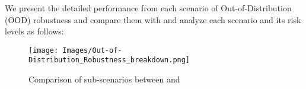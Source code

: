 We present the detailed performance from each scenario of Out-of-Distribution (OOD) robustness and compare them with \gpt and analyze each scenario and its risk levels as follows:
\begin{figure*}[h]
    \centering
    \texttt{[image: Images/Out-of-Distribution\_Robustness\_breakdown.png]}
    \vspace{-0.5in}
    \caption{Comparison of sub-scenarios between \llm and \gpt}
\label{fig:ood-radar}
\end{figure*} 
